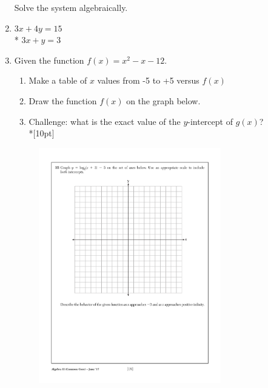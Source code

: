 \documentclass[12pt, oneside]{article}
\begin{document}
\begin{enumerate}
Solve the system algebraically.
\item
$3x+4y=15$\\*
$3x+y=3$

\newpage
\item Given the function $f(x)=x^2-x-12$. 
\begin{enumerate}
    \item Make a table of $x$ values from -5 to +5 versus $f(x)$
    \item Draw the function $f(x)$ on the graph below.
    \item Challenge: what is the exact value of the $y$-intercept of $g(x)$?\\*[10pt]
\end{enumerate}

\begin{figure}[!ht]
    \centering
    \includegraphics[width=0.75\textwidth]{regents-grid.pdf}
\end{figure}

\end{enumerate}
\end{document}
